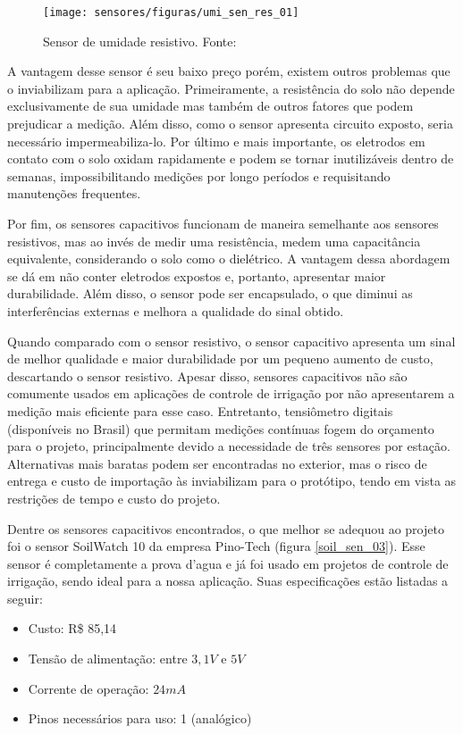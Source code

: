 		\begin{figure}[H]
			\centering
			\texttt{[image: sensores/figuras/umi\_sen\_res\_01]}
			\caption{Sensor de umidade resistivo. Fonte: \cite{bib_umi_sen_res_01}}
			\label{umi_sen_res_01}
		\end{figure}	
		
		A vantagem desse sensor é seu baixo preço porém, existem outros problemas que o inviabilizam para a aplicação. Primeiramente, a resistência do solo não depende exclusivamente de sua umidade mas também de outros fatores que podem prejudicar a medição. Além disso, como o sensor apresenta circuito exposto, seria necessário impermeabiliza-lo. Por último e mais importante, os eletrodos em contato com o solo oxidam rapidamente e podem se tornar inutilizáveis dentro de semanas, impossibilitando medições por longo períodos e requisitando manutenções frequentes.
		
		Por fim, os sensores capacitivos funcionam de maneira semelhante aos sensores resistivos, mas ao invés de medir uma resistência, medem uma capacitância equivalente, considerando o solo como o dielétrico. A vantagem dessa abordagem se dá em não conter eletrodos expostos e, portanto, apresentar maior durabilidade. Além disso, o sensor pode ser encapsulado, o que diminui as interferências externas e melhora a qualidade do sinal obtido.
		
		Quando comparado com o sensor resistivo, o sensor capacitivo apresenta um sinal de melhor qualidade e maior durabilidade por um pequeno aumento de custo, descartando o sensor resistivo. Apesar disso, sensores capacitivos não são comumente usados em aplicações de controle de irrigação por não apresentarem a medição mais eficiente para esse caso. Entretanto, tensiômetro digitais (disponíveis no Brasil) que permitam medições contínuas fogem do orçamento para o projeto, principalmente devido a necessidade de três sensores por estação. Alternativas mais baratas podem ser encontradas no exterior, mas o risco de entrega e custo de importação às inviabilizam para o protótipo, tendo em vista as restrições de tempo e custo do projeto.
		
		Dentre os sensores capacitivos encontrados, o que melhor se adequou ao projeto foi o sensor SoilWatch 10 da empresa Pino-Tech (figura \ref{soil_sen_03}). Esse sensor é completamente a prova d'agua e já foi usado em projetos de controle de irrigação, sendo ideal para a nossa aplicação. Suas especificações estão listadas a seguir:
		
		\begin{itemize}
					\item Custo: R\$ 85,14 
					\item Tensão de alimentação: entre $3,1V$ e $5V$
					\item Corrente de operação: $24 mA$
					\item Pinos necessários para uso: 1 (analógico)
		\end{itemize}

